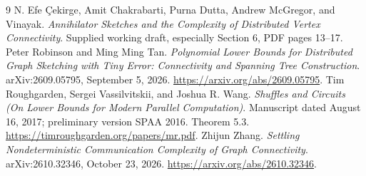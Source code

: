 \documentclass[11pt]{article}
\theoremstyle{definition}\newtheorem{definition}[theorem]{Definition}
\theoremstyle{remark}\newtheorem{remark}[theorem]{Remark}
\begin{document}
\begin{thebibliography}{9}
 N. Efe \c{C}ekirge, Amit Chakrabarti, Purna Dutta, Andrew McGregor, and Vinayak.
\emph{Annihilator Sketches and the Complexity of Distributed Vertex Connectivity}.
Supplied working draft, especially Section 6, PDF pages 13--17.
 Peter Robinson and Ming Ming Tan.
\emph{Polynomial Lower Bounds for Distributed Graph Sketching with Tiny Error: Connectivity and Spanning Tree Construction}.
arXiv:2609.05795, September 5, 2026.
\url{https://arxiv.org/abs/2609.05795}.
 Tim Roughgarden, Sergei Vassilvitskii, and Joshua R. Wang.
\emph{Shuffles and Circuits (On Lower Bounds for Modern Parallel Computation)}.
Manuscript dated August 16, 2017; preliminary version SPAA 2016. Theorem 5.3.
\url{https://timroughgarden.org/papers/mr.pdf}.
 Zhijun Zhang.
\emph{Settling Nondeterministic Communication Complexity of Graph Connectivity}.
arXiv:2610.32346, October 23, 2026.
\url{https://arxiv.org/abs/2610.32346}.
\end{thebibliography}
\end{document}
